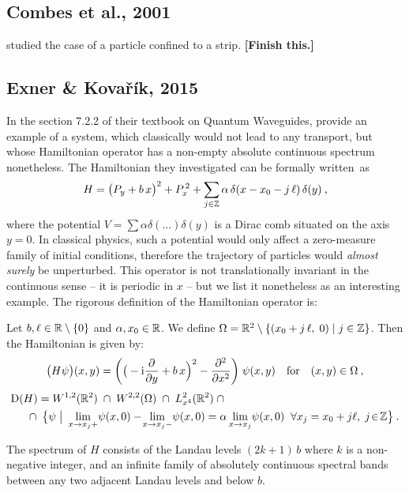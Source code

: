\subsection{Combes et al., 2001}
\cite{Combes2001} studied the case of a particle confined to a strip.
\textbf{[Finish this.]}

\subsection{Exner \& Kovařík, 2015}
In the section 7.2.2 of their textbook on Quantum Waveguides, \cite{ExnerKovarik2015} provide an example of a system, which classically would not lead to any transport, but whose Hamiltonian operator has a non-empty absolute continuous spectrum nonetheless. The Hamiltonian they investigated can be formally written~as
\begin{equation*}
    H
    = \big(P_y + b \, x \big)^2
    + P_x^{\,2}
    + \sum_{j\in\mathbb{Z}} \alpha \, \delta(x - x_0 - j \, \ell) \, \delta(y)
    \: ,
\end{equation*}
where the potential $V = \sum\alpha\delta(...)\delta(y)$ is a Dirac comb situated on the axis $y=0$. In classical physics, such a potential would only affect a zero-measure family of initial conditions, therefore the trajectory of particles would \textit{almost surely} be unperturbed. This operator is not translationally invariant in the continuous sense – it is periodic in $x$ – but we list it nonetheless as an interesting example. The rigorous definition of the Hamiltonian operator is:
\begin{defn}
    Let $b, \ell \in \mathbb{R} \setminus \{0\}$ and $\alpha, x_0 \in \mathbb{R}$. We define $\Omega = \mathbb{R}^2 \setminus \{ (x_0 + j \, \ell, \; 0) \;|\; j \in \mathbb{Z} \}$. Then the Hamiltonian is given by:
    \begin{equation*}
        \big( H\psi \big)(x, y)
        = \bigg(
            \big(-\mathrm{i}\frac{\partial }{\partial y} + b \, x \Big)^2 - \frac{\partial ^2}{\partial x^2}
        \bigg) \; \psi(x, y)
        \quad
        \text{for}
        \quad
        (x, y) \in \Omega
        \: ,
    \end{equation*}
    \begin{align*}
        \Domain(H)
        &= W^{1,2}(\R^2)
        \;\cap\; W^{2,2}(\Omega)
        \;\cap\; L^2_{x^4}(\R^2)
        \;\cap \\
        &\hspace{-10pt}
        \cap\;
        \big\{
            \psi
            \;\big|\
            \lim_{x \to x_j+}\! \psi(x, 0) - \!\lim_{x \to x_j-}\! \psi(x, 0)
            = \alpha \lim_{x \to x_j}\! \psi(x, 0)
            \;\; \forall x_j = x_0 + j \ell, \; j \!\in\! \Z
        \big\}
        \:.
    \end{align*}
\end{defn}
\begin{thm}
    The spectrum of $H$ consists of the Landau levels $(2k + 1) \, b$ where $k$ is a non-negative integer, and an infinite family of absolutely continuous spectral bands between any two adjacent Landau levels and below $b$.
\end{thm}

